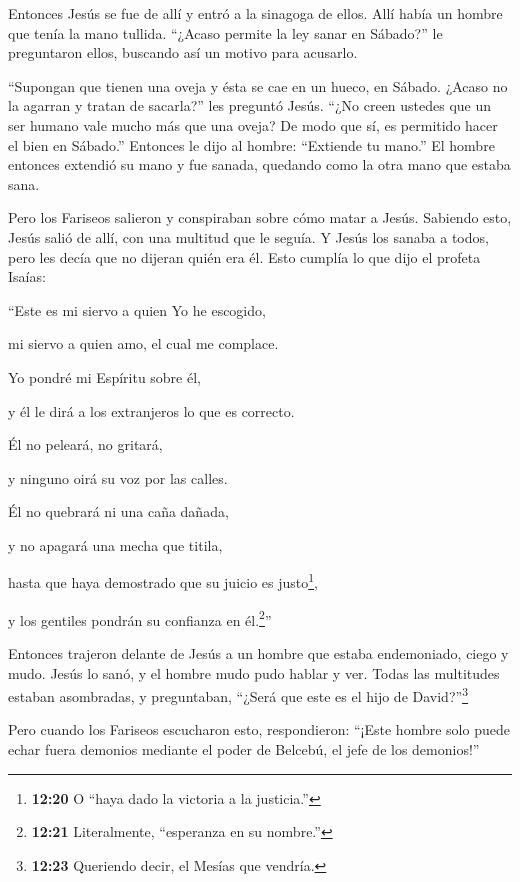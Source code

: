  Entonces Jesús se fue de allí y entró a la sinagoga de
ellos.  Allí había un hombre que tenía la mano tullida.
``¿Acaso permite la ley sanar en Sábado?'' le preguntaron ellos,
buscando así un motivo para acusarlo.

 ``Supongan que tienen una oveja y ésta se cae en un hueco,
en Sábado. ¿Acaso no la agarran y tratan de sacarla?'' les preguntó
Jesús.  ``¿No creen ustedes que un ser humano vale mucho
más que una oveja? De modo que sí, es permitido hacer el bien en
Sábado.''  Entonces le dijo al hombre: ``Extiende tu
mano.'' El hombre entonces extendió su mano y fue sanada, quedando como
la otra mano que estaba sana.

 Pero los Fariseos salieron y conspiraban sobre cómo matar
a Jesús.  Sabiendo esto, Jesús salió de allí, con una
multitud que le seguía. Y Jesús los sanaba a todos,  pero
les decía que no dijeran quién era él.  Esto cumplía lo que
dijo el profeta Isaías:

 ``Este es mi siervo a quien Yo he escogido,

mi siervo a quien amo, el cual me complace.

Yo pondré mi Espíritu sobre él,

y él le dirá a los extranjeros lo que es correcto.

 Él no peleará, no gritará,

y ninguno oirá su voz por las calles.

 Él no quebrará ni una caña dañada,

y no apagará una mecha que titila,

hasta que haya demostrado que su juicio es justo\footnote{\textbf{12:20}
  O ``haya dado la victoria a la justicia.''},

 y los gentiles pondrán su confianza en él.\footnote{\textbf{12:21}
  Literalmente, ``esperanza en su nombre.''}''

 Entonces trajeron delante de Jesús a un hombre que estaba
endemoniado, ciego y mudo. Jesús lo sanó, y el hombre mudo pudo hablar y
ver.  Todas las multitudes estaban asombradas, y
preguntaban, ``¿Será que este es el hijo de David?''\footnote{\textbf{12:23}
  Queriendo decir, el Mesías que vendría.}

 Pero cuando los Fariseos escucharon esto, respondieron:
``¡Este hombre solo puede echar fuera demonios mediante el poder de
Belcebú, el jefe de los demonios!''

